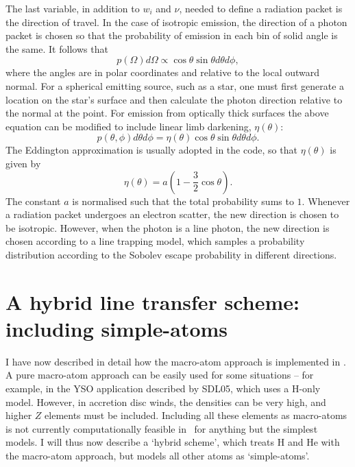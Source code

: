 The last variable, in addition to $w_i$ and $\nu$, needed to define a 
radiation packet is the direction of travel.
In the case of isotropic emission, the direction of a photon packet
is chosen so that the probability of emission in each bin of solid
angle is the same. It follows that 
\begin{equation}
p(\Omega)d\Omega \propto \cos \theta \sin \theta d\theta d\phi,
\end{equation}
where the angles are in polar coordinates and relative to the local
outward normal. For a spherical emitting source, such as 
a star, one must first generate a location on the star's surface
and then calculate the photon direction relative to the normal at the point.
For emission from optically thick surfaces the above equation can be modified
to include linear limb darkening, $\eta(\theta)$:
\begin{equation}
p(\theta, \phi) d\theta d\phi = \eta(\theta) \cos \theta \sin \theta d\theta d\phi.
\end{equation}
The Eddington approximation is usually adopted in the code, so that $\eta(\theta)$
is given by
\begin{equation}
\eta(\theta) = a (1 - \frac{3}{2} \cos \theta).
\end{equation}
The constant $a$ is normalised such that the total probability
sums to $1$. Whenever a radiation packet undergoes an electron scatter,
the new direction is chosen to be isotropic. However,
when the photon is a line photon, the new direction is chosen
according to a line trapping model, which samples a probability 
distribution according to the Sobolev escape probability in different 
directions. 






\section{A hybrid line transfer scheme: including simple-atoms}

I have now described in detail how the macro-atom approach is 
implemented in \py. A pure macro-atom approach can be easily used for
some situations -- for example, in the YSO application described by 
SDL05, which uses a H-only model. However, in accretion
disc winds, the densities can be very high, and higher $Z$ elements must be 
included. Including all these elements as macro-atoms is not
currently computationally feasible in \py\ for anything but the simplest
models. I will thus now describe a `hybrid scheme', which treats H and He
with the macro-atom approach, but models all other atoms 
as `simple-atoms'. 

